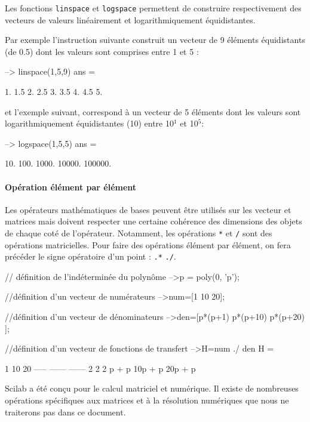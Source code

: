 Les fonctions \verb?linspace? et \verb?logspace? permettent de construire 
respectivement des vecteurs de valeurs linéairement et logarithmiquement 
équidistantes.  

Par exemple l'instruction suivante construit un vecteur de 9 éléments 
équidistants (de 0.5) dont les valeurs sont comprises entre 1 et 5 :
\begin{Scilabcode}
--> linspace(1,5,9)
 ans  =

    1.   1.5   2.   2.5   3.   3.5   4.   4.5   5.
\end{Scilabcode}
et l'exemple suivant, correspond à un vecteur de 5 éléments dont les 
valeurs sont logarithmiquement équidistantes (10) entre 10$^1$ et 10$^5$:
\begin{Scilabcode}
--> logspace(1,5,5)
 ans  =

    10.   100.   1000.   10000.   100000.

\end{Scilabcode}
\paragraph{Opération élément par élément}
Les opérateurs mathématiques de bases peuvent être utilisés 
sur les vecteur et matrices mais doivent respecter une certaine 
cohérence des dimensions des objets de chaque coté de l'opérateur. 
Notamment, les opérations \verb?*? et \verb?/? sont des opérations 
matricielles. Pour faire des opérations élément par élément,
on fera précéder le signe opératoire d'un point : \verb?.*? \verb?./?.
\begin{Scilabcode}
// définition de l'indéterminée du polynôme
-->p = poly(0, 'p');

//définition d'un vecteur de numérateurs
-->num=[1 10 20];

//définition d'un vecteur de dénominateurs
-->den=[p*(p+1) p*(p+10) p*(p+20) ];

//définition d'un vecteur de fonctions de transfert
-->H=num ./ den
 H  =
 
      1         10          20      
    -----     ------      ------    
         2           2           2  
    p + p     10p + p     20p + p   
\end{Scilabcode}
Scilab a été conçu pour le calcul matriciel et numérique. 
Il existe de nombreuses opérations spécifiques aux matrices et à la 
résolution numériques que nous ne traiterons pas dans ce document.

